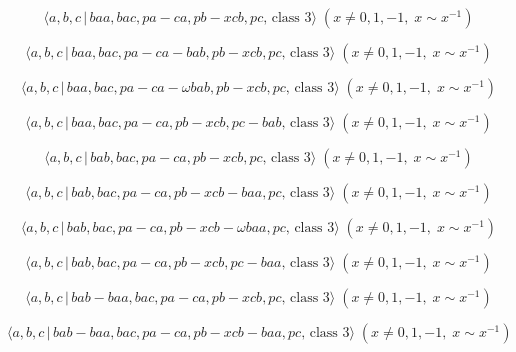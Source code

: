 \documentclass[10pt]{article}
\begin{document}
\begin{equation}
\langle a,b,c\,|\,baa,bac,pa-ca,pb-xcb,pc,\,\text{class }3\rangle \;(x\neq
0,1,-1,\;x\sim x^{-1})  \tag{7.1309}
\end{equation}

\begin{equation}
\langle a,b,c\,|\,baa,bac,pa-ca-bab,pb-xcb,pc,\,\text{class }3\rangle
\;(x\neq 0,1,-1,\;x\sim x^{-1})  \tag{7.1310}
\end{equation}

\begin{equation}
\langle a,b,c\,|\,baa,bac,pa-ca-\omega bab,pb-xcb,pc,\,\text{class }3\rangle
\;(x\neq 0,1,-1,\;x\sim x^{-1})  \tag{7.1311}
\end{equation}

\begin{equation}
\langle a,b,c\,|\,baa,bac,pa-ca,pb-xcb,pc-bab,\,\text{class }3\rangle
\;(x\neq 0,1,-1,\;x\sim x^{-1})  \tag{7.1312}
\end{equation}

\begin{equation}
\langle a,b,c\,|\,bab,bac,pa-ca,pb-xcb,pc,\,\text{class }3\rangle \;(x\neq
0,1,-1,\;x\sim x^{-1})  \tag{7.1313}
\end{equation}

\begin{equation}
\langle a,b,c\,|\,bab,bac,pa-ca,pb-xcb-baa,pc,\,\text{class }3\rangle
\;(x\neq 0,1,-1,\;x\sim x^{-1})  \tag{7.1314}
\end{equation}

\begin{equation}
\langle a,b,c\,|\,bab,bac,pa-ca,pb-xcb-\omega baa,pc,\,\text{class }3\rangle
\;(x\neq 0,1,-1,\;x\sim x^{-1})  \tag{7.1315}
\end{equation}

\begin{equation}
\langle a,b,c\,|\,bab,bac,pa-ca,pb-xcb,pc-baa,\,\text{class }3\rangle
\;(x\neq 0,1,-1,\;x\sim x^{-1})  \tag{7.1316}
\end{equation}

\begin{equation}
\langle a,b,c\,|\,bab-baa,bac,pa-ca,pb-xcb,pc,\,\text{class }3\rangle
\;(x\neq 0,1,-1,\;x\sim x^{-1})  \tag{7.1317}
\end{equation}

\begin{equation}
\langle a,b,c\,|\,bab-baa,bac,pa-ca,pb-xcb-baa,pc,\,\text{class }3\rangle
\;(x\neq 0,1,-1,\;x\sim x^{-1})  \tag{7.1318}
\end{equation}
\end{document}

